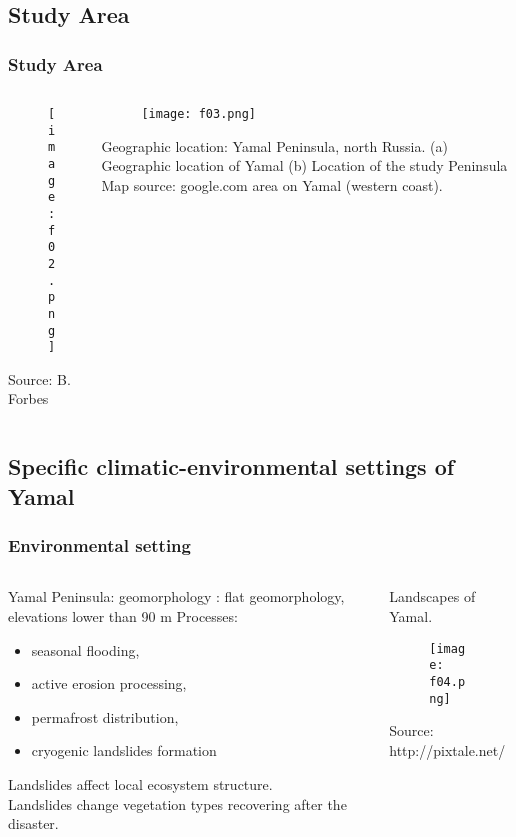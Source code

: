 \documentclass[pdflatex,compress,8pt,
	xcolor={dvipsnames,dvipsnames,svgnames,x11names,table},
	hyperref={colorlinks = true,breaklinks = true, urlcolor = NavyBlue, breaklinks = true}]{beamer}
\begin{document}
\subsection{Study Area}
\begin{frame}\frametitle{Study Area}
\begin{minipage}[0.4\textheight]{\textwidth}
\begin{columns}[T]
\begin{column}{0.5\textwidth}
\vspace{2em}
\begin{figure}[H]
	\centering
		\texttt{[image: f02.png]}
\end{figure}
Source: B. Forbes
\end{column}
\begin{column}{0.5\textwidth}
\vspace{2em}
\begin{figure}[H]
	\centering
		\texttt{[image: f03.png]}
\end{figure}
Geographic location: Yamal Peninsula, north Russia.
(a) Geographic location of Yamal
(b) Location of the study Peninsula Map source: google.com area on Yamal (western coast). 
\end{column}
\end{columns}
\end{minipage}
\end{frame}

\subsection{Specific climatic-environmental settings of Yamal}

\begin{frame}\frametitle{Environmental setting}
\begin{minipage}[0.4\textheight]{\textwidth}
\begin{columns}[T]
\begin{column}{0.5\textwidth}
Yamal Peninsula: geomorphology : flat geomorphology, elevations lower than 90 m
Processes:
 \begin{itemize}
        	\item seasonal flooding,
	\item active erosion processing,
	\item permafrost distribution,
	\item cryogenic landslides formation
\end{itemize}
Landslides affect local ecosystem structure. \\
Landslides change vegetation types recovering after the disaster.
\end{column}
\begin{column}{0.5\textwidth}
Landscapes of Yamal. 
\begin{figure}[H]
	\centering
		\texttt{[image: f04.png]}
\end{figure}
Source: http://pixtale.net/
\end{column}
\end{columns}
\end{minipage}
\end{frame}
\end{document}
